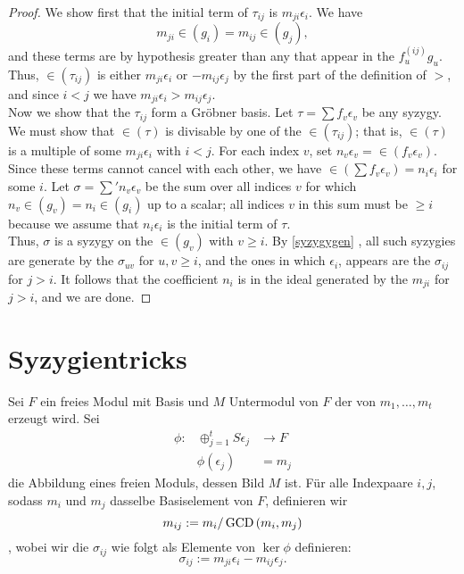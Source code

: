 \documentclass{article}
\begin{document}
{\color{red}
\begin{proof}
We show first that the initial term of
\( \tau_{ij} \)
is
\( m_{ji} \epsilon_{i} \). We have
\[
m_{ji} \in \left( g_{i} \right) = m_{ij} \in \left( g_{j} \right),
\]
and these terms are by hypothesis greater than any that appear in the
\( f_{u}^{\left( ij \right)} g_{u} .\)
Thus,
\( \in\left( \tau_{ij} \right) \)
is either
\( m_{ji} \epsilon_{i} \)
or
\( -m_{ij}\epsilon_{j} \)
by the first part of the definition of
\( > \),
and since
\( i < j \)
we have
\( m_{ji} \epsilon_{i} > m_{ij}\epsilon_{j} .\) \\
Now we show that the
\( \tau_{ij} \)
form a Gr\"obner basis.
Let
\( \tau = \sum f_{v} \epsilon_{v}\)
be any syzygy.
We must show that
\( \in\left( \tau \right) \)
is divisable by one of the
\( \in\left( \tau_{ij} \right)\);
that is,
\( \in\left( \tau \right) \)
is a multiple of some
\( m_{ji} \epsilon_{i} \)
with
\( i<j \).
For each index
\(v \),
set
\(n_{v} \epsilon_{v}=\in\left( f_{v}\epsilon_{v} \right) \).
Since these terms cannot cancel with each other,
we have
\( \in\left( \sum f_{v}\epsilon_{v} \right)=n_{i}\epsilon_{i}\)
for some
\( i\).
Let
\( \sigma=\sum'n_{v} \epsilon_{v} \)
be the sum over all indices
\( v \)
for which
\( n_v \in \left( g_{v} \right)=n_{i} \in\left( g_{i} \right) \)
up to a scalar;
all indices
\( v \)
in this sum must be
\( \ge i \)
because we assume that
\( n_{i} \epsilon_{i} \)
is the initial term of
\( \tau \). \\
Thus,
\( \sigma \)
is a syzygy on the
\( \in\left( g_{v} \right) \)
with
\( v \ge i\).
By \ref{syzygygen} ,
all such syzygies are generate by the
\( \sigma_{uv} \)
for
\( u,v \ge i \),
and the ones in which
\( \epsilon_{i} \),
appears are the
\( \sigma_{ij}\)
for
\( j > i \).
It follows that the coefficient
\(n_{i}\)
is in the ideal generated by the
\(m_{ji}\)
for
\( j> i \),
and we are done.
\end{proof}
}
\section{Syzygientricks}

\begin{nota}
	Sei 
	\( F \) 
	ein freies Modul mit Basis 
	und
	\( M \)
	Untermodul von 
	\( F \)
	der von 
	\( m_{1} , \dots , m_{t} \)
	erzeugt wird.
	Sei
	\begin{align*}
		\phi:	& \oplus_{j=1}^{t} S\epsilon_{j} &\to   F \\
			& \phi\left( \epsilon_{j} \right) &=  m_{j}
	\end{align*}
	die Abbildung eines freien Moduls, dessen Bild
	\( M \)
	ist.
	F\"ur alle Indexpaare 	
	\( i,j \),
	sodass 
	\( m_{i}\)
	und 
	\( m_{j}\)
	dasselbe Basiselement von 
	\( F \),
	definieren wir 
	\[
		m_{ij} := m_{i}/\operatorname{GCD}\left( m_{i},m_{j} \right) 
	\],
	wobei wir die 
	\( \sigma_{ij}\)
	wie folgt als Elemente von 
	\( \ker \phi \)
	definieren:
	\[
		\sigma_{ij} := m_{ji}\epsilon_{i}-m_{ij}\epsilon_{j} .
	\]

\end{nota}
\end{document}
